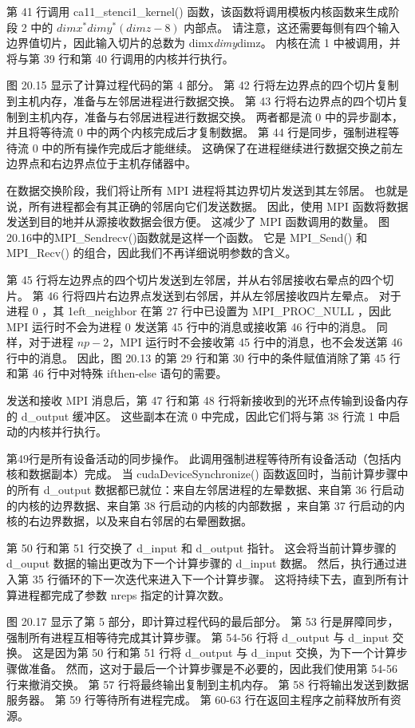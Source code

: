 第 41 行调用 ca11\_stenci1\_kernel() 函数，该函数将调用模板内核函数来生成阶段 2 中的 $d i m x^{*} d i m y^{*}(d i m z-8)$ 内部点。 请注意，这还需要每侧有四个输入边界值切片，因此输入切片的总数为 dimx\textit{dimy}dimz。 内核在流 1 中被调用，并将与第 39 行和第 40 行调用的内核并行执行。

图 20.15 显示了计算过程代码的第 4 部分。 第 42 行将左边界点的四个切片复制到主机内存，准备与左邻居进程进行数据交换。 第 43 行将右边界点的四个切片复制到主机内存，准备与右邻居进程进行数据交换。 两者都是流 0 中的异步副本，并且将等待流 0 中的两个内核完成后才复制数据。 第 44 行是同步，强制进程等待流 0 中的所有操作完成后才能继续。 这确保了在进程继续进行数据交换之前左边界点和右边界点位于主机存储器中。

在数据交换阶段，我们将让所有 MPI 进程将其边界切片发送到其左邻居。 也就是说，所有进程都会有其正确的邻居向它们发送数据。 因此，使用 MPI 函数将数据发送到目的地并从源接收数据会很方便。 这减少了 MPI 函数调用的数量。 图20.16中的MPI\_Sendrecv()函数就是这样一个函数。 它是 MPI\_Send() 和 MPI\_Recv() 的组合，因此我们不再详细说明参数的含义。

第 45 行将左边界点的四个切片发送到左邻居，并从右邻居接收右晕点的四个切片。 第 46 行将四片右边界点发送到右邻居，并从左邻居接收四片左晕点。 对于进程 0 ，其 1eft\_neighbor 在第 27 行中已设置为 MPI\_PROC\_NULL ，因此 MPI 运行时不会为进程 0 发送第 45 行中的消息或接收第 46 行中的消息。 同样，对于进程 $n p-2$，MPI 运行时不会接收第 45 行中的消息，也不会发送第 46 行中的消息。 因此，图 20.13 的第 29 行和第 30 行中的条件赋值消除了第 45 行和第 46 行中对特殊 ifthen-else 语句的需要。

发送和接收 MPI 消息后，第 47 行和第 48 行将新接收到的光环点传输到设备内存的 d\_output 缓冲区。 这些副本在流 0 中完成，因此它们将与第 38 行流 1 中启动的内核并行执行。

第49行是所有设备活动的同步操作。 此调用强制进程等待所有设备活动（包括内核和数据副本）完成。 当 cudaDeviceSynchronize() 函数返回时，当前计算步骤中的所有 d\_output 数据都已就位：来自左邻居进程的左晕数据、来自第 36 行启动的内核的边界数据、来自第 38 行启动的内核的内部数据 ，来自第 37 行启动的内核的右边界数据，以及来自右邻居的右晕圈数据。

第 50 行和第 51 行交换了 d\_input 和 d\_output 指针。 这会将当前计算步骤的 d\_ouput 数据的输出更改为下一个计算步骤的 d\_input 数据。 然后，执行通过进入第 35 行循环的下一次迭代来进入下一个计算步骤。 这将持续下去，直到所有计算进程都完成了参数 nreps 指定的计算次数。

图 20.17 显示了第 5 部分，即计算过程代码的最后部分。 第 53 行是屏障同步，强制所有进程互相等待完成其计算步骤。 第 54-56 行将 d\_output 与 d\_input 交换。 这是因为第 50 行和第 51 行将 d\_output 与 d\_input 交换，为下一个计算步骤做准备。 然而，这对于最后一个计算步骤是不必要的，因此我们使用第 54-56 行来撤消交换。 第 57 行将最终输出复制到主机内存。 第 58 行将输出发送到数据服务器。 第 59 行等待所有进程完成。 第 60-63 行在返回主程序之前释放所有资源。


